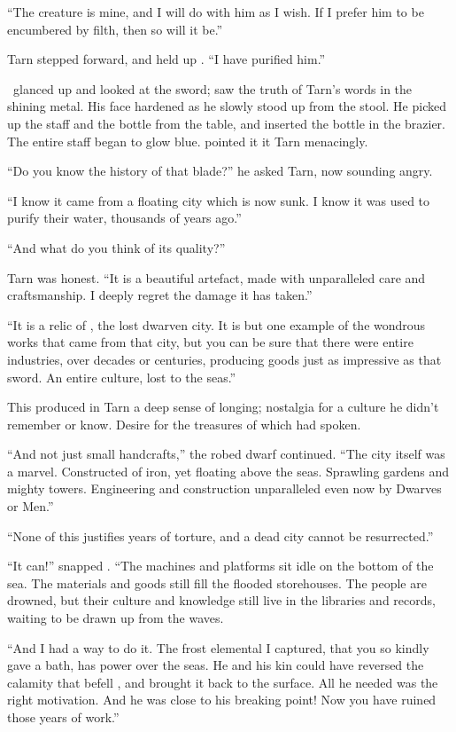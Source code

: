 ``The creature is mine, and I will do with him as I wish.  If I prefer him to be encumbered by filth, then so will it be.''

Tarn stepped forward, and held up \kildir.  ``I have purified him.''

\mothzam\ glanced up and looked at the sword; saw the truth of Tarn's words in the shining metal.  His face hardened as he slowly stood up from the stool.  He picked up the staff and the bottle from the table, and inserted the bottle in the brazier.  The entire staff began to glow blue.  \mothzam pointed it it Tarn menacingly.

``Do you know the history of that blade?'' he asked Tarn, now sounding angry.

``I know it came from a floating city which is now sunk.  I know it was used to purify their water, thousands of years ago.''

``And what do you think of its quality?''

Tarn was honest.  ``It is a beautiful artefact, made with unparalleled care and craftsmanship.  I deeply regret the damage it has taken.''

``It is a relic of \valdunmir, the lost dwarven city.  It is but one example of the wondrous works that came from that city, but you can be sure that there were entire industries, over decades or centuries, producing goods just as impressive as that sword.  An entire culture, lost to the seas.''

This produced in Tarn a deep sense of longing; nostalgia for a culture he didn't remember or know.  Desire for the treasures of which \mothzam had spoken.

``And not just small handcrafts,'' the robed dwarf continued. ``The city itself was a marvel.  Constructed of iron, yet floating above the seas.  Sprawling gardens and mighty towers.  Engineering and construction unparalleled even now by Dwarves or Men.''

``None of this justifies years of torture, and a dead city cannot be resurrected.''

``It can!'' snapped \mothzam.  ``The machines and platforms sit idle on the bottom of the sea.  The materials and goods still fill the flooded storehouses.  The people are drowned, but their culture and knowledge still live in the libraries and records, waiting to be drawn up from the waves.

``And I had a way to do it.  The frost elemental I captured, that you so kindly gave a bath, has power over the seas.  He and his kin could have reversed the calamity that befell \valdunmir, and brought it back to the surface.  All he needed was the right motivation.  And he was close to his breaking point!  Now you have ruined those years of work.''

